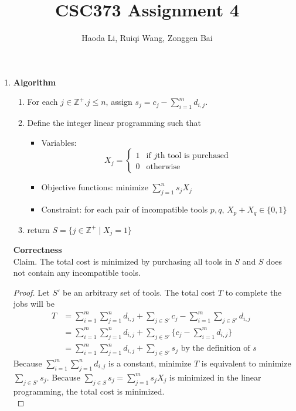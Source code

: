 \documentclass[11pt]{article}
\title{CSC373 Assignment 4}
\author{Haoda Li, Ruiqi Wang, Zonggen Bai}
\begin{document}
\maketitle
\begin{enumerate}
\item \textbf{Algorithm} 
\begin{enumerate}
    \item For each $j\in\mathbb{Z}^+. j\leq n$, assign $s_j = c_j - \sum_{i=1}^m d_{i,j}$. 
    \item Define the integer linear programming such that
    \begin{itemize}
        \item Variables: \[
        X_j= 
        \begin{cases}
            1 & \text{if } j \text{th tool is purchased} \\
            0 & \text{otherwise}
        \end{cases}
        \]
        \item Objective functions: minimize $\sum_{j=1}^n s_jX_j$
        \item Constraint: for each pair of incompatible tools $p,q$, $X_p + X_q \in \{0,1\}$
    \end{itemize}
    \item return $S = \{j\in\mathbb{Z^+}\mid X_j = 1\}$
\end{enumerate}

\textbf{Correctness} \\
Claim. The total cost is minimized by purchasing all tools in $S$ and $S$ does not contain any incompatible tools. 
\begin{proof}
Let $S'$ be an arbitrary set of tools. The total cost $T$ to complete the jobs will be 
\begin{align*}
    T &=\sum_{i=1}^m\sum_{j=1}^n d_{i,j} + \sum_{j\in S'} c_j - \sum_{i=1}^m\sum_{j\in S'} d_{i,j} \\
    &=\sum_{i=1}^m\sum_{j=1}^n d_{i,j} +  \sum_{j\in S'}\{c_j - \sum_{i=1}^m d_{i,j}\} \\
    &=\sum_{i=1}^m\sum_{j=1}^n d_{i,j} +  \sum_{j\in S'} s_j \text{ by the definition of } s
\end{align*} 
Because $\sum_{i=1}^m\sum_{j=1}^n d_{i,j}$ is a constant, minimize $T$ is equivalent to minimize $\sum_{j\in S'} s_j$. 
Because $\sum_{j\in S} s_j = \sum_{j=1}^m s_jX_j$ is minimized in the linear programming, the total cost is minimized. \\


\end{proof}
\end{enumerate}
\end{document}
